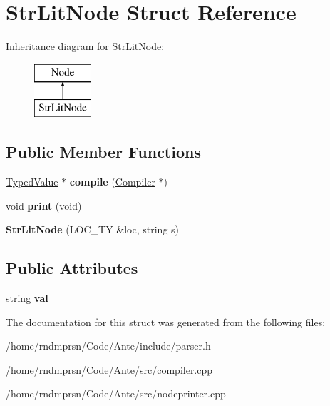 \hypertarget{structStrLitNode}{}\section{Str\+Lit\+Node Struct Reference}
\label{structStrLitNode}
Inheritance diagram for Str\+Lit\+Node\+:\begin{figure}[H]
\begin{center}
\leavevmode
\includegraphics[height=2.000000cm]{structStrLitNode}
\end{center}
\end{figure}
\subsection*{Public Member Functions}
\begin{DoxyCompactItemize}
\item 
\mbox{\label{structStrLitNode_ab80f0394ea38907501f228682dd410dc}} 
\hyperlink{structTypedValue}{Typed\+Value} $\ast$ {\bfseries compile} (\hyperlink{structante_1_1Compiler}{Compiler} $\ast$)
\item 
\mbox{\label{structStrLitNode_aa82d55c93bc0cdf4d908122f2968c46e}} 
void {\bfseries print} (void)
\item 
\mbox{\label{structStrLitNode_a93362d423a43bfb2beac557bf130075c}} 
{\bfseries Str\+Lit\+Node} (L\+O\+C\+\_\+\+TY \&loc, string s)
\end{DoxyCompactItemize}
\subsection*{Public Attributes}
\begin{DoxyCompactItemize}
\item 
\mbox{\label{structStrLitNode_a3b893d87683075809d5c877b19df1507}} 
string {\bfseries val}
\end{DoxyCompactItemize}


The documentation for this struct was generated from the following files\+:\begin{DoxyCompactItemize}
\item 
/home/rndmprsn/\+Code/\+Ante/include/parser.\+h\item 
/home/rndmprsn/\+Code/\+Ante/src/compiler.\+cpp\item 
/home/rndmprsn/\+Code/\+Ante/src/nodeprinter.\+cpp\end{DoxyCompactItemize}
